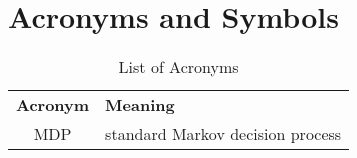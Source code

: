 \section{Acronyms and Symbols}\label{List of Symbols}
\bgroup
\def\arraystretch{1.5}%
\tabulinesep=4.0mm
\begin{longtabu} to \textwidth{CL}
\caption{List of Acronyms}
\setlength\extrarowheight{0pt}\\ %
\bottomrule
\textbf{Acronym} & \textbf{Meaning} \\\midrule
\endhead
\bottomrule
\endfoot
MDP                 & standard Markov decision process
\end{longtabu}
\egroup

